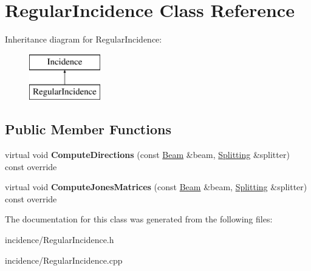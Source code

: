 \hypertarget{class_regular_incidence}{}\section{Regular\+Incidence Class Reference}
\label{class_regular_incidence}
Inheritance diagram for Regular\+Incidence\+:\begin{figure}[H]
\begin{center}
\leavevmode
\includegraphics[height=2.000000cm]{class_regular_incidence}
\end{center}
\end{figure}
\subsection*{Public Member Functions}
\begin{DoxyCompactItemize}
\item 
\mbox{\label{class_regular_incidence_ab6309234cb20084574efcd996a97b83b}} 
virtual void {\bfseries Compute\+Directions} (const \mbox{\hyperlink{class_beam}{Beam}} \&beam, \mbox{\hyperlink{class_splitting}{Splitting}} \&splitter) const override
\item 
\mbox{\label{class_regular_incidence_a57dd610b361741330a53776d5fbfef2b}} 
virtual void {\bfseries Compute\+Jones\+Matrices} (const \mbox{\hyperlink{class_beam}{Beam}} \&beam, \mbox{\hyperlink{class_splitting}{Splitting}} \&splitter) const override
\end{DoxyCompactItemize}


The documentation for this class was generated from the following files\+:\begin{DoxyCompactItemize}
\item 
incidence/Regular\+Incidence.\+h\item 
incidence/Regular\+Incidence.\+cpp\end{DoxyCompactItemize}
